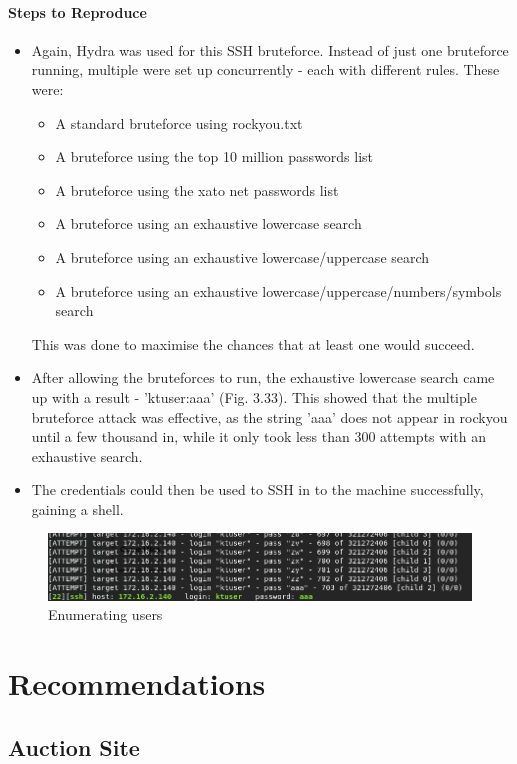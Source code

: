 \documentclass{report}
\begin{document}
\subsubsection{Steps to Reproduce}
\begin{itemize}
	\item Again, Hydra was used for this SSH bruteforce. Instead of just one bruteforce running, multiple were set up concurrently - each with different rules. These were:
	\begin{itemize}
		\item A standard bruteforce using rockyou.txt
		\item A bruteforce using the top 10 million passwords list
		\item A bruteforce using the xato net passwords list
		\item A bruteforce using an exhaustive lowercase search
		\item A bruteforce using an exhaustive lowercase/uppercase search
		\item A bruteforce using an exhaustive lowercase/uppercase/numbers/symbols search
	\end{itemize}
	This was done to maximise the chances that at least one would succeed.
	\item After allowing the bruteforces to run, the exhaustive lowercase search came up with a result - 'ktuser:aaa' (Fig. 3.33). This showed that the multiple bruteforce attack was effective, as the string 'aaa' does not appear in rockyou until a few thousand in, while it only took less than 300 attempts with an exhaustive search.
	\item The credentials could then be used to SSH in to the machine successfully, gaining a shell.
\end{itemize}
\begin{figure}[!htb]
	\centering
	\includegraphics[scale=0.6]{img/140ssh1.png}
	\caption{Enumerating users}
\end{figure}





\chapter{Recommendations}
\section{Auction Site}
\end{document}
